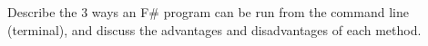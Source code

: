 Describe the 3 ways an F\# program can be run from the command line (terminal), and discuss the advantages and disadvantages of each method.